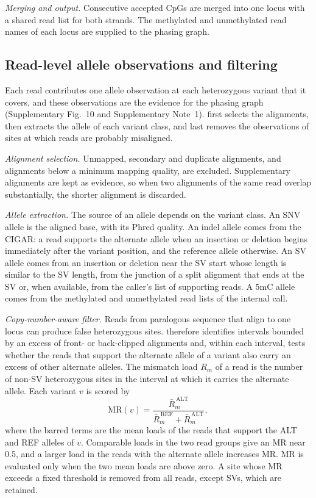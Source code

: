 \emph{Merging and output.}  Consecutive accepted CpGs are merged into one locus with a shared read list for both strands.  The methylated and unmethylated read names of each locus are supplied to the phasing graph.

\subsection*{Read-level allele observations and filtering}
Each read contributes one allele observation at each heterozygous variant that it covers, and these observations are the evidence for the phasing graph (Supplementary Fig.~10 and Supplementary Note~1).  \toolname first selects the alignments, then extracts the allele of each variant class, and last removes the observations of sites at which reads are probably misaligned.

\emph{Alignment selection.}  Unmapped, secondary and duplicate alignments, and alignments below a minimum mapping quality, are excluded.  Supplementary alignments are kept as evidence, so when two alignments of the same read overlap substantially, the shorter alignment is discarded.

\emph{Allele extraction.}  The source of an allele depends on the variant class.  An SNV allele is the aligned base, with its Phred quality.  An indel allele comes from the CIGAR: a read supports the alternate allele when an insertion or deletion begins immediately after the variant position, and the reference allele otherwise.  An SV allele comes from an insertion or deletion near the SV start whose length is similar to the SV length, from the junction of a split alignment that ends at the SV or, when available, from the caller's list of supporting reads.  A 5mC allele comes from the methylated and unmethylated read lists of the internal call.

\emph{Copy-number-aware filter.}  Reads from paralogous sequence that align to one locus can produce false heterozygous sites.  \toolname therefore identifies intervals bounded by an excess of front- or back-clipped alignments and, within each interval, tests whether the reads that support the alternate allele of a variant also carry an excess of other alternate alleles.  The mismatch load $R_m$ of a read is the number of non-SV heterozygous sites in the interval at which it carries the alternate allele.  Each variant $v$ is scored by
\begin{equation}
\mathrm{MR}(v) = \frac{\bar{R}_m^{\,\mathrm{ALT}}}{\bar{R}_m^{\,\mathrm{REF}} + \bar{R}_m^{\,\mathrm{ALT}}},
\label{eq:cnvmr}
\end{equation}
where the barred terms are the mean loads of the reads that support the ALT and REF alleles of $v$.  Comparable loads in the two read groups give an MR near 0.5, and a larger load in the reads with the alternate allele increases MR.  MR is evaluated only when the two mean loads are above zero.  A site whose MR exceeds a fixed threshold is removed from all reads, except SVs, which are retained.

